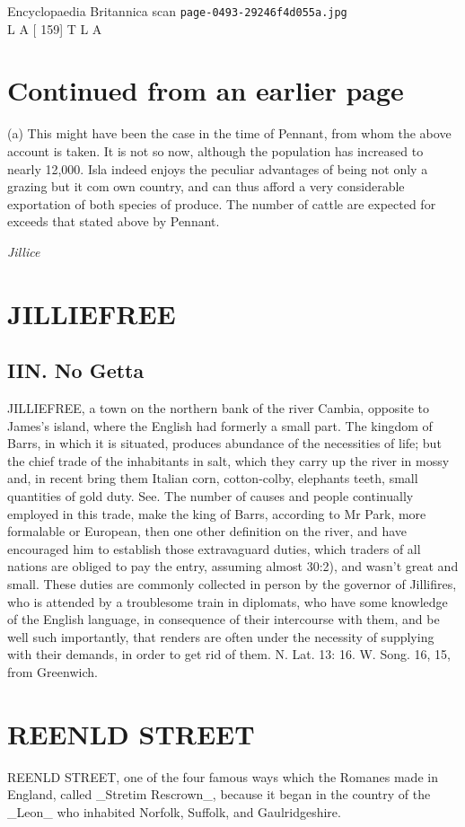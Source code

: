 \documentclass{article}
\begin{document}
\begin{center}
{\Large Encyclopaedia Britannica scan \texttt{page-0493-29246f4d055a.jpg}}\\[0.5em]
L A [ 159] T L A
\end{center}
\section*{Continued from an earlier page}
(a) This might have been the case in the time of Pennant, from whom the above account is taken. It is not so now, although the population has increased to nearly 12,000. Isla indeed enjoys the peculiar advantages of being not only a grazing but it com own country, and can thus afford a very considerable exportation of both species of produce. The number of cattle are expected for exceeds that stated above by Pennant.

\textit{Jillice}
\section*{JILLIEFREE}
\subsection*{IIN. No Getta}
JILLIEFREE, a town on the northern bank of the river Cambia, opposite to James’s island, where the English had formerly a small part. The kingdom of Barrs, in which it is situated, produces abundance of the necessities of life; but the chief trade of the inhabitants in salt, which they carry up the river in mossy and, in recent bring them Italian corn, cotton-colby, elephants teeth, small quantities of gold duty. See. The number of causes and people continually employed in this trade, make the king of Barrs, according to Mr Park, more formalable or European, then one other definition on the river, and have encouraged him to establish those extravaguard duties, which traders of all nations are obliged to pay the entry, assuming almost 30:2), and wasn't great and small. These duties are commonly collected in person by the governor of Jillifires, who is attended by a troublesome train in diplomats, who have some knowledge of the English language, in consequence of their intercourse with them, and be well such importantly, that renders are often under the necessity of supplying with their demands, in order to get rid of them. N. Lat. 13: 16. W. Song. 16, 15, from Greenwich.

\section*{REENLD STREET}
REENLD STREET, one of the four famous ways which the Romanes made in England, called \_Stretim Rescrown\_, because it began in the country of the \_Leon\_ who inhabited Norfolk, Suffolk, and Gaulridgeshire.
\end{document}
